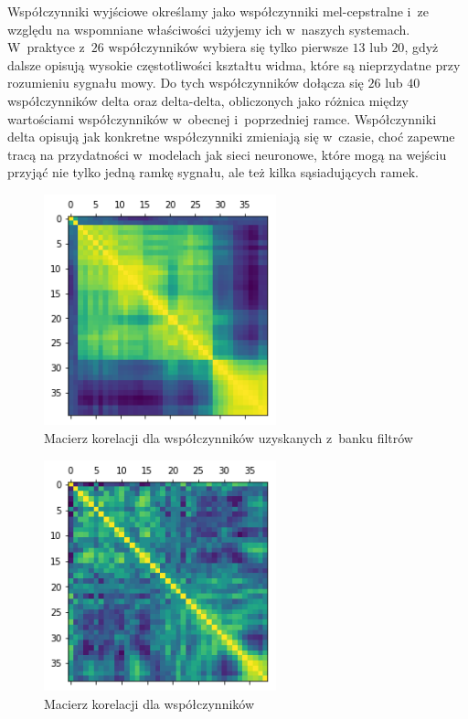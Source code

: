 Współczynniki wyjściowe  określamy jako współczynniki mel-cepstralne i~ze względu na
wspomniane właściwości użyjemy ich
w~naszych systemach. W~praktyce z~$26$ współczynników wybiera się tylko pierwsze $13$ lub $20$, gdyż dalsze opisują
wysokie częstotliwości kształtu widma, które są nieprzydatne przy rozumieniu sygnału mowy.
Do tych współczynników dołącza się $26$ lub $40$
współczynników delta oraz delta-delta, obliczonych jako różnica między wartościami współczynników w~obecnej i~poprzedniej
ramce. Współczynniki delta opisują jak konkretne współczynniki zmieniają się w~czasie,
choć zapewne tracą na przydatności w~modelach jak sieci neuronowe, które mogą na wejściu przyjąć nie tylko jedną ramkę sygnału,
ale też kilka sąsiadujących ramek.

\begin{figure}[H]
    \centering
    \includegraphics[width=0.6\textwidth]{images/2_1_f_correlation_matrix_banks}
    \caption{Macierz korelacji dla współczynników uzyskanych z~banku filtrów}
    \label{fig:2_1_f_correlation_matrix_banks}
\end{figure}

\begin{figure}[H]
    \centering
    \includegraphics[width=0.6\textwidth]{images/2_1_g_correlation_matrix_mfcc}
    \caption{Macierz korelacji dla współczynników }
    \label{fig:2_1_g_correlation_matrix_mfcc}
\end{figure}

